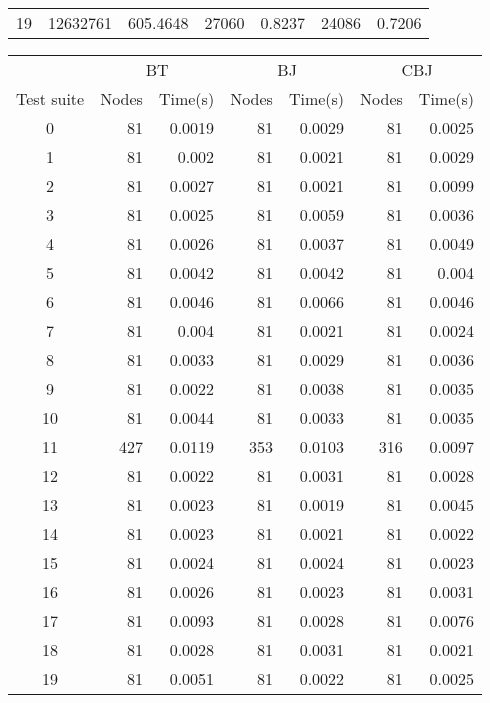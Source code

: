 {\begin{tabular}{crrrrrr}
      19 & 12632761 & 605.4648 & 27060 & 0.8237 & 24086 & 0.7206\\
    \end{tabular}
    \begin{tabular}{crrrrrr}
      \cellcolor[gray]{0.7} & \multicolumn{2}{c}{BT\cellcolor[gray]{0.7}} & \multicolumn{2}{c}{BJ\cellcolor[gray]{0.7}}  & \multicolumn{2}{c}{CBJ\cellcolor[gray]{0.7}} \\
      \cellcolor[gray]{0.7} Test suite & \multicolumn{1}{c}{\cellcolor[gray]{0.7}Nodes} & \multicolumn{1}{c}{\cellcolor[gray]{0.7}Time(s)} & \multicolumn{1}{c}{\cellcolor[gray]{0.7}Nodes} & \multicolumn{1}{c}{\cellcolor[gray]{0.7}Time(s)} & \multicolumn{1}{c}{\cellcolor[gray]{0.7}Nodes} & \multicolumn{1}{c}{\cellcolor[gray]{0.7}Time(s)}\\
      0 & 81 & 0.0019 & 81 & 0.0029 & 81 & 0.0025\\
      1 & 81 & 0.002 & 81 & 0.0021 & 81 & 0.0029\\
      2 & 81 & 0.0027 & 81 & 0.0021 & 81 & 0.0099\\
      3 & 81 & 0.0025 & 81 & 0.0059 & 81 & 0.0036\\
      4 & 81 & 0.0026 & 81 & 0.0037 & 81 & 0.0049\\
      5 & 81 & 0.0042 & 81 & 0.0042 & 81 & 0.004\\
      6 & 81 & 0.0046 & 81 & 0.0066 & 81 & 0.0046\\
      7 & 81 & 0.004 & 81 & 0.0021 & 81 & 0.0024\\
      8 & 81 & 0.0033 & 81 & 0.0029 & 81 & 0.0036\\
      9 & 81 & 0.0022 & 81 & 0.0038 & 81 & 0.0035\\
      10 & 81 & 0.0044 & 81 & 0.0033 & 81 & 0.0035\\
      11 & 427 & 0.0119 & 353 & 0.0103 & 316 & 0.0097\\
      12 & 81 & 0.0022 & 81 & 0.0031 & 81 & 0.0028\\
      13 & 81 & 0.0023 & 81 & 0.0019 & 81 & 0.0045\\
      14 & 81 & 0.0023 & 81 & 0.0021 & 81 & 0.0022\\
      15 & 81 & 0.0024 & 81 & 0.0024 & 81 & 0.0023\\
      16 & 81 & 0.0026 & 81 & 0.0023 & 81 & 0.0031\\
      17 & 81 & 0.0093 & 81 & 0.0028 & 81 & 0.0076\\
      18 & 81 & 0.0028 & 81 & 0.0031 & 81 & 0.0021\\
      19 & 81 & 0.0051 & 81 & 0.0022 & 81 & 0.0025\\
    \end{tabular}
    }